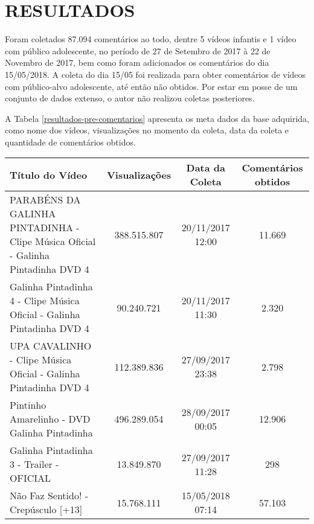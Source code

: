 \section{RESULTADOS}

Foram coletados 87.094 comentários ao todo, dentre 5 vídeos infantis e 1 vídeo com público adolescente, no período de 27 de Setembro de 2017 à 22 de Novembro de 2017, bem como foram adicionados os comentários do dia 15/05/2018. 
A coleta do dia 15/05 foi realizada para obter comentários de vídeos com público-alvo adolescente, até então não obtidos. Por estar em posse de um conjunto de dados extenso, o autor não realizou coletas posteriores. %

A Tabela \ref{resultados-pre-comentarios} apresenta os meta dados da base adquirida, como nome dos vídeos,  visualizações no momento da coleta, data da coleta e quantidade de comentários obtidos.

\begin{table}[H]
\begin{tabular}{|p{5.5cm}|c|c|c|}
\hline
\textbf{Título do Vídeo} & \textbf{Visualizações} & \textbf{Data da Coleta} & \textbf{Comentários obtidos} \\ \hline
PARABÉNS DA GALINHA PINTADINHA - Clipe Música Oficial - Galinha Pintadinha DVD 4 & 388.515.807 & 20/11/2017 12:00 & 11.669 \\ \hline
Galinha Pintadinha 4 - Clipe Música Oficial - Galinha Pintadinha DVD 4 & 90.240.721 & 20/11/2017 11:30 & 2.320 \\ \hline
UPA CAVALINHO - Clipe Música Oficial - Galinha Pintadinha DVD 4 & 112.389.836 & 27/09/2017 23:38 & 2.798 \\ \hline
Pintinho Amarelinho - DVD Galinha Pintadinha & 496.289.054 & 28/09/2017 00:05 & 12.906 \\ \hline
Galinha Pintadinha 3 - Trailer - OFICIAL & 13.849.870 & 27/09/2017 11:28 & 298 \\ \hline
Não Faz Sentido! - Crepúsculo [+13] & 15.768.111 & 15/05/2018 07:14 & 57.103 \\ \hline
\end{tabular}

\end{table}

